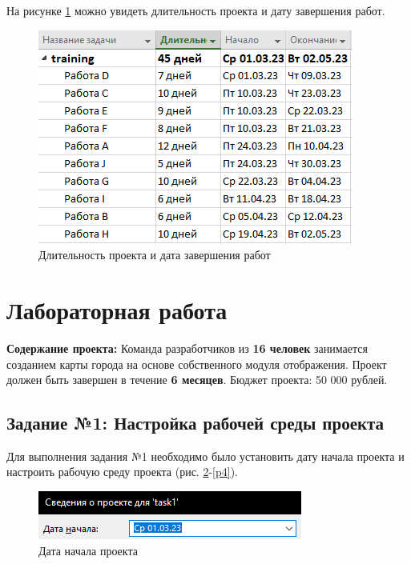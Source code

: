 \newpage
На рисунке \ref{p3} можно увидеть длительность проекта и дату завершения работ.
\begin{figure}[!h]
	\centering
	\includegraphics[width=0.7\linewidth]{inc/img/3.png}
	\caption{Длительность проекта и дата завершения работ}
	\label{p3}
\end{figure}

\section*{Лабораторная работа}
\textbf{Содержание проекта:} Команда разработчиков из \textbf{16 человек} занимается созданием карты города на основе собственного модуля отображения. Проект должен быть завершен в течение \textbf{6 месяцев}. Бюджет проекта: 50 000 рублей.

\subsection*{Задание №1: Настройка рабочей среды проекта}
Для выполнения задания №1 необходимо было установить дату начала проекта и настроить рабочую среду проекта (рис. \ref{p4.0}-\ref{p4}).

\begin{figure}[!h]
	\centering
	\includegraphics[width=1\linewidth]{inc/img/4.0.png}
	\caption{Дата начала проекта}
	\label{p4.0}
\end{figure}

